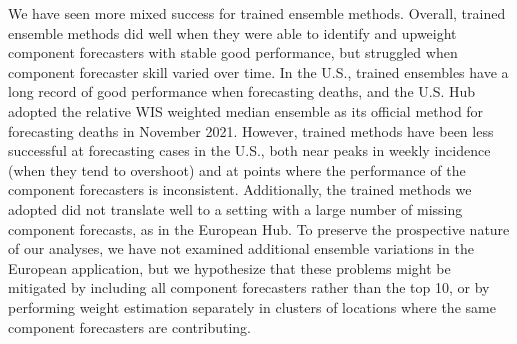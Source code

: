 \documentclass[11pt,3p,review,authoryear]{elsarticle}
\begin{document}
We have seen more mixed success for trained ensemble methods.
Overall, trained ensemble methods did well when they were able to identify and upweight component forecasters with stable good performance, but struggled when component forecaster skill varied over time.
In the U.S., trained ensembles have a long record of good performance when forecasting deaths, and the U.S. Hub adopted the relative WIS weighted median ensemble as its official method for forecasting deaths in November 2021.
However, trained methods have been less successful at forecasting cases in the U.S., both near peaks in weekly incidence (when they tend to overshoot) and at points where the performance of the component forecasters is inconsistent.
Additionally, the trained methods we adopted did not translate well to a setting with a large number of missing component forecasts, as in the European Hub.
To preserve the prospective nature of our analyses, we have not examined additional ensemble variations in the European application, but we hypothesize that these problems might be mitigated by including all component forecasters rather than the top 10, or by performing weight estimation separately in clusters of locations where the same component forecasters are contributing.

\end{document}
